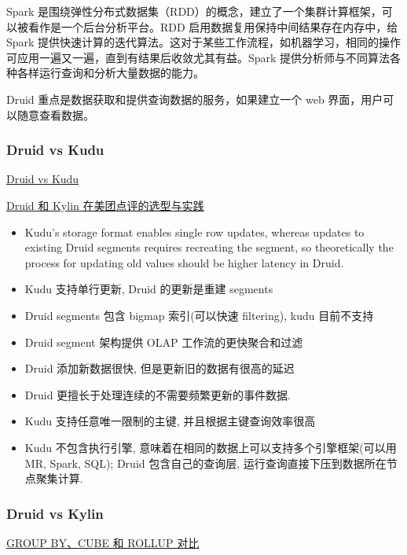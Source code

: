 \documentclass[hyperref, UTF-8]{ctexart}
\begin{document}
Spark 是围绕弹性分布式数据集（RDD）的概念，建立了一个集群计算框架，可以被看作是一个后台分析平台。RDD 启用数据复用保持中间结果存在内存中，给 Spark 提供快速计算的迭代算法。这对于某些工作流程，如机器学习，相同的操作可应用一遍又一遍，直到有结果后收敛尤其有益。Spark 提供分析师与不同算法各种各样运行查询和分析大量数据的能力。

Druid 重点是数据获取和提供查询数据的服务，如果建立一个 web 界面，用户可以随意查看数据。

\subsubsection{Druid vs Kudu}
\label{sec:orga6b3e4a}
\href{http://druid.io/docs/latest/comparisons/druid-vs-kudu.html}{Druid vs Kudu}

\href{http://www.ouyangchen.com/wp-content/uploads/2017/03/Meetup-Druid\%E5\%92\%8CKylin\%E5\%9C\%A8\%E7\%BE\%8E\%E5\%9B\%A2\%E7\%82\%B9\%E8\%AF\%84\%E7\%9A\%84\%E9\%80\%89\%E5\%9E\%8B\%E4\%B8\%8E\%E5\%AE\%9E\%E8\%B7\%B5.pdf}{Druid 和 Kylin 在美团点评的选型与实践}

\begin{itemize}
\item Kudu's storage format enables single row updates, whereas updates to existing Druid segments requires recreating the segment, so theoretically the process for updating old values should be higher latency in Druid.
\item Kudu 支持单行更新, Druid 的更新是重建 segments
\item Druid segments 包含 bigmap 索引(可以快速 filtering), kudu 目前不支持
\item Druid segment 架构提供 OLAP 工作流的更快聚合和过滤
\item Druid 添加新数据很快, 但是更新旧的数据有很高的延迟
\item Druid 更擅长于处理连续的不需要频繁更新的事件数据.
\item Kudu 支持任意唯一限制的主键, 并且根据主键查询效率很高
\item Kudu 不包含执行引擎, 意味着在相同的数据上可以支持多个引擎框架(可以用 MR, Spark, SQL); Druid 包含自己的查询层, 运行查询直接下压到数据所在节点聚集计算.
\end{itemize}
\subsubsection{Druid vs Kylin}
\label{sec:orgcd96e96}
\href{http://www.cnblogs.com/dyufei/archive/2009/11/12/2573974.html}{GROUP BY、CUBE 和  ROLLUP 对比}
\end{document}
